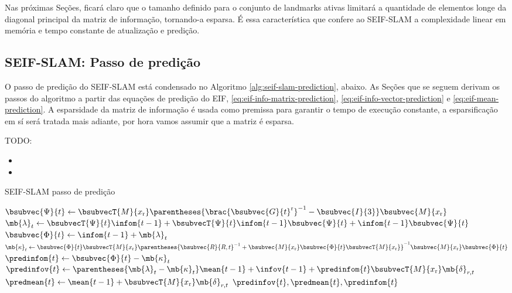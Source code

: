 Nas próximas Seções, ficará claro que o tamanho definido para o conjunto de 
landmarks ativas limitará a quantidade de elementos longe da diagonal 
principal da matriz de informação, tornando-a esparsa. É essa 
característica que confere ao SEIF-SLAM a complexidade linear em memória e 
tempo constante de atualização e predição.

\subsection{SEIF-SLAM: Passo de predição}
\label{sec:seif-prediction}
\newcommand{\psitvalue}{\bsubvecT{M}{x_\mathrm{r}} \parentheses{\brac{\bsubvec{G}{t}^{\mathrm{r}}}^{-1} - \bsubvec{I}{3}} \bsubvec{M}{x_\mathrm{r}}}
\newcommand{\kappatvalue}{\bsubvec{\Phi}{t}\bsubvecT{M}{x_\mathrm{r}}
    \parentheses{\bsubvec{R}{R,t}^{-1} + \bsubvec{M}{x_\mathrm{r}}\bsubvec{\Phi}{t}
      \bsubvecT{M}{x_\mathrm{r}}}^{-1} \bsubvec{M}{x_\mathrm{r}}\bsubvec{\Phi}{t}
}
\newcommand{\lambdatvalue}{\bsubvecT{\Psi}{t}\infom{t-1} + \bsubvecT{\Psi}{t}\infom{t-1}\bsubvec{\Psi}{t} + \infom{t-1}\bsubvec{\Psi}{t}}
\newcommand{\predXiTValue}{\parentheses{\mb{\lambda}_t - \mb{\kappa}_t}\mean{t-1} + \infov{t-1} + \predinfom{t}\bsubvecT{M}{x_\mathrm{r}} \mb{\delta}_{r,t}}
\newcommand{\predmeanTValue}{\mean{t-1} + \bsubvecT{M}{x_\mathrm{r}} \mb{\delta}_{r,t}}
O passo de predição do SEIF-SLAM está condensado no Algoritmo \ref{alg:seif-slam-prediction}, abaixo. As Seções que se seguem derivam os 
passos do algoritmo a partir das equações de predição do EIF, \ref{eq:eif-info-matrix-prediction}, \ref{eq:eif-info-vector-prediction} e \ref{eq:eif-mean-prediction}. A esparsidade da matriz de informação é 
usada como premissa para garantir o tempo de execução constante, 
a esparsificação em sí será tratada mais adiante, por hora vamos assumir que a matriz é esparsa.

TODO: 
\begin{itemize}
  \item {}
  \item {}
\end{itemize}
\begin{algorithm}[h]
  \caption{SEIF-SLAM passo de predição}
  \label{alg:seif-slam-prediction}
  \begin{algorithmic}[1]
    \State $\bsubvec{\Psi}{t} \gets \psitvalue $
    \State $\mb{\lambda}_t \gets \lambdatvalue$
    \State $\bsubvec{\Phi}{t} \gets \infom{t-1} + \mb{\lambda}_t$
    \State $\mb{\kappa}_t \gets \kappatvalue$
    \State $\predinfom{t} \gets \bsubvec{\Phi}{t} - \mb{\kappa}_t$
    \State $\predinfov{t} \gets \predXiTValue$
    \State $\predmean{t} \gets \predmeanTValue$
    \State \Return $\predinfov{t}, \predmean{t}, \predinfom{t}$
    \EndProcedure
  \end{algorithmic}
\end{algorithm}

